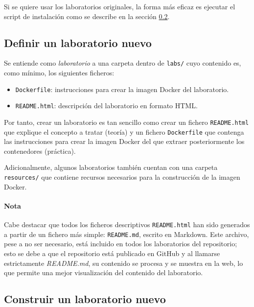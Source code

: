             Si se quiere usar los laboratorios originales, la forma más eficaz es ejecutar el script de instalación como se describe en la sección \ref{sec:construir-laboratorio}.

        \subsection{Definir un laboratorio nuevo}

            Se entiende como \textit{laboratorio} a una carpeta dentro de \texttt{labs/} cuyo contenido es, como mínimo, los siguientes ficheros:
            
            \begin{itemize}
                \item \texttt{Dockerfile}: instrucciones para crear la imagen Docker del laboratorio.
                \item \texttt{README.html}: descripción del laboratorio en formato HTML.
            \end{itemize}

            Por tanto, crear un laboratorio es tan sencillo como crear un fichero \texttt{README.html} que explique el concepto a tratar (teoría) y un fichero \texttt{Dockerfile} que contenga las instrucciones para crear la imagen Docker del que extraer posteriormente los contenedores (práctica).

            Adicionalmente, algunos laboratorios también cuentan con una carpeta \texttt{resources/} que contiene recursos necesarios para la construcción de la imagen Docker.

            \paragraph{Nota}
                
                Cabe destacar que todos los ficheros descriptivos \texttt{README.html} han sido generados a partir de un fichero más simple: \texttt{README.md}, escrito en Markdown. Este archivo, pese a no ser necesario, está incluido en todos los laboratorios del repositorio; esto se debe a que el repositorio está publicado en GitHub y al llamarse estrictamente \textit{README.md}, su contenido se procesa y se muestra en la web, lo que permite una mejor visualización del contenido del laboratorio.

        \subsection{Construir un laboratorio nuevo}
            \label{sec:construir-laboratorio}

